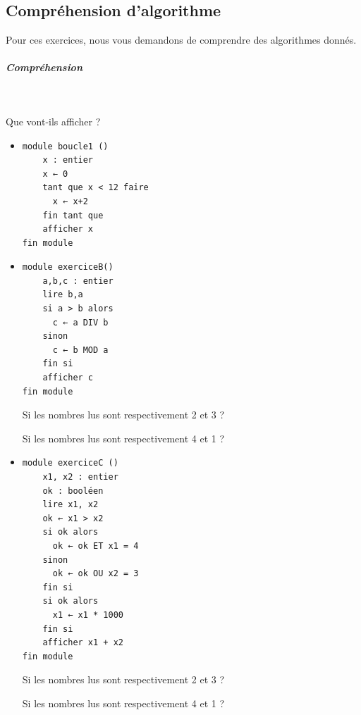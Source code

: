 \documentclass[11pt,a4paper]{article}
\begin{document}
            \par
        \subsection{Compr\'ehension d'algorithme}
          Pour ces exercices, nous vous demandons de comprendre des algorithmes donn\'es. 
          
			
		\subparagraph{Compr\'ehension} 
		
                \textcolor{white}{.} \par
            
							  Que vont-ils afficher ?
              
					\begin{itemize}
				
			\item \begin{verbatim}
module boucle1 ()
    x : entier
    x ← 0
    tant que x < 12 faire
      x ← x+2
    fin tant que
    afficher x
fin module
				\end{verbatim} \textcolor{gray}{\underline{\hspace*{2em}}} 
			\item \begin{verbatim}
module exerciceB()
    a,b,c : entier
    lire b,a
    si a > b alors
      c ← a DIV b
    sinon
      c ← b MOD a
    fin si
    afficher c
fin module
				\end{verbatim}Si les nombres lus sont respectivement 2 et 3 ? 
            \par
         \textcolor{gray}{\underline{\hspace*{1em}}} Si les nombres lus sont respectivement 4 et 1 ? 
            \par
         \textcolor{gray}{\underline{\hspace*{1em}}} 
			\item \begin{verbatim}
module exerciceC ()
    x1, x2 : entier
    ok : booléen
    lire x1, x2
    ok ← x1 > x2
    si ok alors
      ok ← ok ET x1 = 4
    sinon
      ok ← ok OU x2 = 3
    fin si
    si ok alors
      x1 ← x1 * 1000
    fin si
    afficher x1 + x2
fin module
				\end{verbatim}Si les nombres lus sont respectivement 2 et 3 ? 
            \par
         \textcolor{gray}{\underline{\hspace*{3em}}} Si les nombres lus sont respectivement 4 et 1 ? 
            \par
         \textcolor{gray}{\underline{\hspace*{3em}}} 
					\end{itemize}
				
\end{document}
